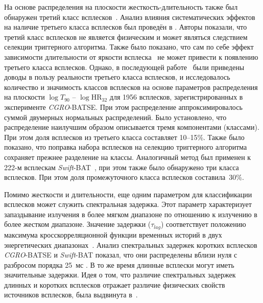На основе распределения на плоскости жесткость-длительность также был обнаружен третий класс всплесков~\citep{Mukherjee_1998, Hakkila_2000}. Анализ влияния систематических эффектов на наличие третьего класса всплесков был проведён в \citep{Hakkila_2003}. Авторы показали, что третий класс всплесков не является физическим и может являться следствием селекции триггерного алгоритма. Также было показано, что сам по себе эффект зависимости длительности от яркости всплеска~\citep{Bonnell_1997} не может привести к появлению третьего класса всплесков. Однако, в последующей работе~\citep{Horvath_2006} были приведены доводы в пользу реальности третьего класса всплесков, и исследовалось количество и значимость классов всплесков на основе параметров распределения на плоскости $\log T_{90}$ -- $\log \mbox{HR}_{32}$ для 1956 всплесков, зарегистрированных в эксперименте \textit{CGRO}-BATSE. При этом распределение аппроксимировалось суммой двумерных нормальных распределений. Было установлено, что распределение наилучшим образом описывается тремя компонентами (классами). При этом доля всплесков из третьего класса составляет 10--15\%. Также было показано, что поправка набора всплесков на селекцию триггерного алгоритма сохраняет прежнее разделение на классы. Аналогичный метод был применен к 222-м всплескам \textit{Swift}-BAT~\citep{Horvath_2010}, при этом также было обнаружено три класса всплесков. При этом доля промежуточного класса всплесков составила~30\%.

Помимо жесткости и длительности, еще одним параметром для классификации всплесков может служить спектральная задержка. Этот параметр характеризует запаздывание излучения в более мягком диапазоне по отношению к излучению в более жестком диапазоне. Значение задержки ($\tau_{lag}$) соответствует положению  максимума кросскорреляционной функции временных историй в двух энергетических диапазонах~\citep{Norris_2000}. Анализ спектральных задержек коротких всплесков \textit{CGRO}-BATSE и \textit{Swift}-BAT показал, что они распределены вблизи нуля с разбросом порядка 25~мс \citep{Norris_and_Bonnel_2006, Norris2011}. В то же время длинные всплески могут иметь значительные задержки. Идея о том, что различие спектральных задержек длинных и коротких всплесков отражает различие физических свойств источников всплесков, была выдвинута в~\citep{Gehrels_2006_Nature}.


